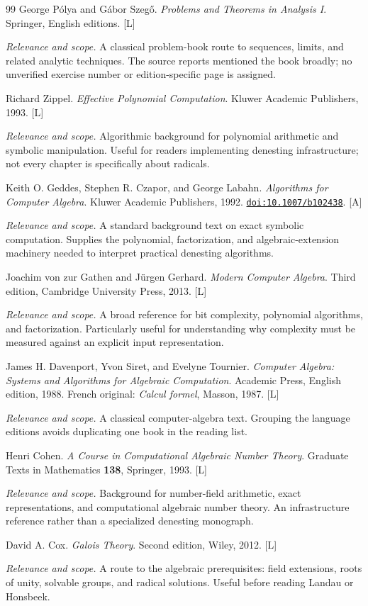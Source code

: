 \documentclass[11pt,letterpaper]{article}
\numberwithin{equation}{section}
\theoremstyle{definition}
\theoremstyle{remark}
\newcommand{\doi}[1]{\href{https://doi.org/#1}{\nolinkurl{doi:#1}}}
\newcommand{\status}[1]{\textsf{\small[#1]}}
\newcommand{\entrynote}[1]{\par\smallskip\noindent\emph{Relevance and scope.} #1}
\begin{document}
\begin{thebibliography}{99}
George P\'olya and G\'abor Szeg\H{o}. \emph{Problems and Theorems in Analysis I}. Springer, English editions. \status{L}
\entrynote{A classical problem-book route to sequences, limits, and related analytic techniques. The source reports mentioned the book broadly; no unverified exercise number or edition-specific page is assigned.}

Richard Zippel. \emph{Effective Polynomial Computation}. Kluwer Academic Publishers, 1993. \status{L}
\entrynote{Algorithmic background for polynomial arithmetic and symbolic manipulation. Useful for readers implementing denesting infrastructure; not every chapter is specifically about radicals.}

Keith O. Geddes, Stephen R. Czapor, and George Labahn. \emph{Algorithms for Computer Algebra}. Kluwer Academic Publishers, 1992. \doi{10.1007/b102438}. \status{A}
\entrynote{A standard background text on exact symbolic computation. Supplies the polynomial, factorization, and algebraic-extension machinery needed to interpret practical denesting algorithms.}

Joachim von zur Gathen and J\"urgen Gerhard. \emph{Modern Computer Algebra}. Third edition, Cambridge University Press, 2013. \status{L}
\entrynote{A broad reference for bit complexity, polynomial algorithms, and factorization. Particularly useful for understanding why complexity must be measured against an explicit input representation.}

James H. Davenport, Yvon Siret, and Evelyne Tournier. \emph{Computer Algebra: Systems and Algorithms for Algebraic Computation}. Academic Press, English edition, 1988. French original: \emph{Calcul formel}, Masson, 1987. \status{L}
\entrynote{A classical computer-algebra text. Grouping the language editions avoids duplicating one book in the reading list.}

Henri Cohen. \emph{A Course in Computational Algebraic Number Theory}. Graduate Texts in Mathematics \textbf{138}, Springer, 1993. \status{L}
\entrynote{Background for number-field arithmetic, exact representations, and computational algebraic number theory. An infrastructure reference rather than a specialized denesting monograph.}

David A. Cox. \emph{Galois Theory}. Second edition, Wiley, 2012. \status{L}
\entrynote{A route to the algebraic prerequisites: field extensions, roots of unity, solvable groups, and radical solutions. Useful before reading Landau or Honsbeek.}


\end{thebibliography}
\end{document}
